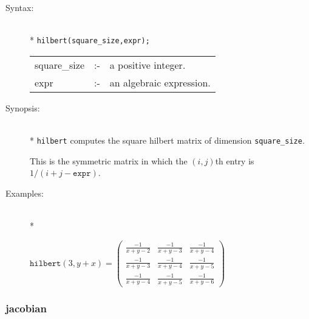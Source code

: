 \begin{description}
\item[Syntax:]\mbox{}\\*
\texttt{hilbert(square\_size,expr);}\\[2mm]
\begin{tabular}{l l l}
square\_size &:-& a positive integer. \\
expr         &:-& an algebraic expression.
\end{tabular}

\item[Synopsis:]\mbox{}\\*
\texttt{hilbert} computes the square hilbert matrix of 
                dimension \texttt{square\_size}. 

This is the symmetric matrix in which the $(i,j)$th entry is
$1/(i+j-\texttt{expr})$.

\item[Examples:]\mbox{}\\*
\begin{flushleft}  
\begin{math}
\texttt{hilbert}(3,y+x)  =
\begin{pmatrix} \frac{-1}{x+y-2} & \frac{-1}{x+y-3} 
& \frac{-1}{x+y-4} \\ \frac{-1}{x+y-3} & \frac{-1}{x+y-4} & 
\frac{-1}{x+y-5} \\ \frac{-1}{x+y-4} & \frac{-1}{x+y-5} & 
\frac{-1}{x+y-6} 
\end{pmatrix}
\end{math}  
\end{flushleft}
\end{description}


\subsubsection{jacobian}
\label{linalg:mat_jacobian}

